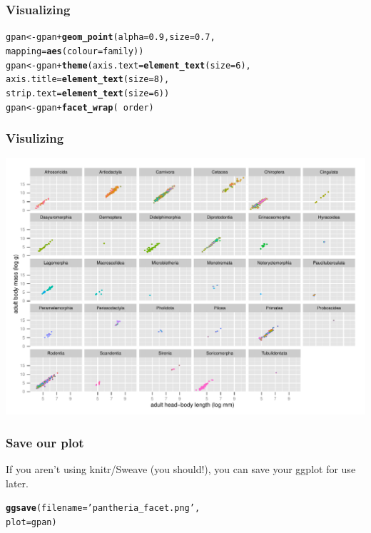 \documentclass{beamer}\usepackage{graphicx, color}
\makeatletter
\def\maxwidth{ %
  \ifdim\Gin@nat@width>\linewidth
    \linewidth
  \else
    \Gin@nat@width
  \fi
}
\newcommand{\hlfunctioncall}[1]{\textcolor[rgb]{0.501960784313725,0,0.329411764705882}{\textbf{#1}}}%
\newcommand{\hlstring}[1]{\textcolor[rgb]{0.6,0.6,1}{#1}}%
\newenvironment{kframe}{%
 \def\at@end@of@kframe{}%
 \ifinner\ifhmode%
  \def\at@end@of@kframe{\end{minipage}}%
  \begin{minipage}{\columnwidth}%
 \fi\fi%
 \def\FrameCommand##1{\hskip\@totalleftmargin \hskip-\fboxsep
 \colorbox{shadecolor}{##1}\hskip-\fboxsep
     \hskip-\linewidth \hskip-\@totalleftmargin \hskip\columnwidth}%
 \MakeFramed {\advance\hsize-\width
   \@totalleftmargin\z@ \linewidth\hsize
   \@setminipage}}%
 {\par\unskip\endMakeFramed%
 \at@end@of@kframe}
\newenvironment{knitrout}{}{} %
\makeatother
\begin{document}
\begin{frame}[fragile]
  \frametitle{Visualizing}
\begin{knitrout}\scriptsize
{}\color{fgcolor}\begin{kframe}
\begin{alltt}
gpan <- gpan + \hlfunctioncall{geom_point}(alpha = 0.9, size = 0.7,
                          mapping = \hlfunctioncall{aes}(colour = family))
gpan <- gpan + \hlfunctioncall{theme}(axis.text = \hlfunctioncall{element_text}(size = 6),
                     axis.title = \hlfunctioncall{element_text}(size = 8),
                     strip.text = \hlfunctioncall{element_text}(size = 6))
gpan <- gpan + \hlfunctioncall{facet_wrap}(~ order)
\end{alltt}
\end{kframe}
\end{knitrout}

\end{frame}

\begin{frame}[fragile]
  \frametitle{Visulizing}
\begin{knitrout}\scriptsize
{}\color{fgcolor}
\includegraphics[width=\maxwidth]{figure/unnamed-chunk-23} 

\end{knitrout}

\end{frame}

\begin{frame}[fragile]
  \frametitle{Save our plot}

  If you aren't using knitr/Sweave (you should!), you can save your ggplot for use later.

\begin{knitrout}\scriptsize
{}\color{fgcolor}\begin{kframe}
\begin{alltt}
\hlfunctioncall{ggsave}(filename = \hlstring{'pantheria_facet.png'},
       plot = gpan)
\end{alltt}
\end{kframe}
\end{knitrout}


\end{frame}
\end{document}
